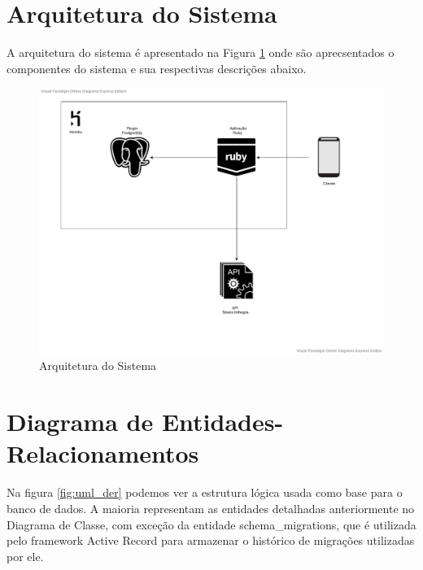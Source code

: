 \section{Arquitetura do Sistema} \label{sec:modelagem:arquitetura}

A arquitetura do sistema é apresentado na Figura \ref{fig:diagram_arquitetura} onde são aprecsentados
o componentes do sistema e sua respectivas descrições abaixo.

\begin{figure}[H]
  \caption{\label{fig:diagram_arquitetura}Arquitetura do Sistema}
  \centering
  \includegraphics[scale=0.6]{imagens/arquitetura-sb.pdf}
\end{figure}


\section{Diagrama de Entidades-Relacionamentos} \label{sec:modelagem:der}

Na figura \ref{fig:uml_der} podemos ver a estrutura lógica usada como base para o banco de dados. A maioria representam 
as entidades detalhadas anteriormente no Diagrama de Classe, com exceção da entidade schema\_migrations, que é utilizada pelo 
framework Active Record para armazenar o histórico de migrações utilizadas por ele.

